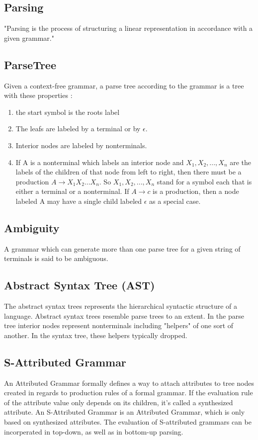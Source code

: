 \subsection{Parsing} 
"Parsing is the process of structuring a linear representation in accordance with a given grammar."\cite{ParserBook}

\subsection{ParseTree}
Given a context-free grammar, a parse tree according to the grammar is a tree with these properties \cite{DragonBook}:
\begin{enumerate}
	\item the start symbol is the roots label
	\item The leafs are labeled by a terminal or by $\epsilon$.
	\item Interior nodes are labeled by nonterminals.
	\item If A is a nonterminal which labels an interior node and $X_1, X_2, . . . , X_n$ are the labels of the children of that node from left to right, then there must be a production $A  \rightarrow X_1X_2 ... X_n$. So $X_1, X_2, ... , X_n$ stand for a symbol each that is either a terminal or a nonterminal. If $A\rightarrow c$ is a production, then a node labeled A may have a single child labeled $\epsilon$ as a special case. 
\end{enumerate}
 
\subsection{Ambiguity} 
A grammar which can generate more than one parse tree for a given string of terminals is said to be ambiguous.\cite{DragonBook}

\subsection{Abstract Syntax Tree (AST)}  
The abstract syntax trees  represents the hierarchical syntactic structure of a language.  Abstract syntax trees resemble parse trees to an extent. In the parse tree interior nodes represent nonterminals including "helpers" of one sort of another. In the syntax tree, these helpers typically dropped. \cite{DragonBook}

\subsection{S-Attributed Grammar} 
An Attributed Grammar formally defines a way to attach attributes to tree nodes created in regards to production rules of a formal grammar. If  the evaluation rule of the attribute value only depends on its children, it's called a synthesized attribute. An S-Attributed Grammar is an Attributed Grammar, which is only based on synthesized attributes. The evaluation of S-attributed grammars can be incorperated in top-down, as well as in bottom-up parsing.\cite{ParserBook}
 

